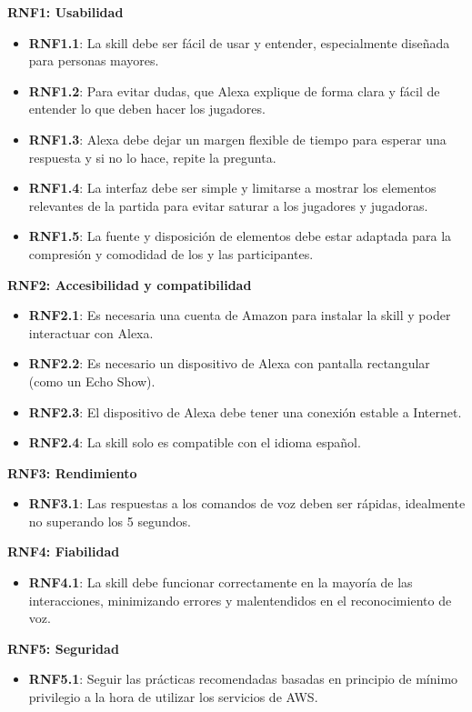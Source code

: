 \textbf{RNF1: Usabilidad}
\begin{itemize}
    \item \textbf{RNF1.1}: La skill debe ser fácil de usar y entender, especialmente diseñada para personas mayores.
    \item \textbf{RNF1.2}: Para evitar dudas, que Alexa explique de forma clara y fácil de entender lo que deben hacer los jugadores.
    \item \textbf{RNF1.3}: Alexa debe dejar un margen flexible de tiempo para esperar una respuesta y si no lo hace, repite la pregunta.
    \item \textbf{RNF1.4}: La interfaz debe ser simple y limitarse a mostrar los elementos relevantes de la partida para evitar saturar a los jugadores y jugadoras.
    \item \textbf{RNF1.5}: La fuente y disposición de elementos debe estar adaptada para la compresión y comodidad de los y las participantes.
\end{itemize}

\textbf{RNF2: Accesibilidad y compatibilidad}
\begin{itemize}
    \item \textbf{RNF2.1}: Es necesaria una cuenta de Amazon para instalar la skill y poder interactuar con Alexa.
    \item \textbf{RNF2.2}: Es necesario un dispositivo de Alexa con pantalla rectangular (como un Echo Show).
    \item \textbf{RNF2.3}: El dispositivo de Alexa debe tener una conexión estable a Internet.
    \item \textbf{RNF2.4}: La skill solo es compatible con el idioma español.
\end{itemize}

\textbf{RNF3: Rendimiento}
\begin{itemize}
    \item \textbf{RNF3.1}: Las respuestas a los comandos de voz deben ser rápidas, idealmente no superando los 5 segundos.
\end{itemize}

\textbf{RNF4: Fiabilidad}
\begin{itemize}
    \item \textbf{RNF4.1}: La skill debe funcionar correctamente en la mayoría de las interacciones, minimizando errores y malentendidos en el reconocimiento de voz.
\end{itemize}

\textbf{RNF5: Seguridad}
\begin{itemize}
	\item \textbf{RNF5.1}: Seguir las prácticas recomendadas basadas en principio de mínimo privilegio a la hora de utilizar los servicios de AWS.
\end{itemize}

